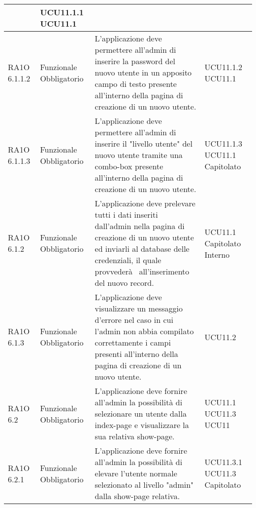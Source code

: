 \begin{center}
\begin{longtable}{ | l | p{2cm} | p{5cm} | p{1.7cm} |}
 &  UCU11.1.1 \newline  UCU11.1 \newline  \\ \hline      
        RA1O 6.1.1.2 & Funzionale \newline  Obbligatorio  & L'applicazione deve permettere all'admin di inserire la password del nuovo utente in un apposito campo di testo presente all'interno della pagina di creazione di un nuovo utente. &  UCU11.1.2 \newline  UCU11.1 \newline  \\ \hline      
        RA1O 6.1.1.3  & Funzionale \newline  Obbligatorio  & L'applicazione deve permettere all'admin di inserire il "livello utente" del nuovo utente tramite una combo-box presente all'interno della pagina di creazione di un nuovo utente. &  UCU11.1.3 \newline  UCU11.1 \newline  Capitolato \newline  \\ \hline      
        RA1O 6.1.2  & Funzionale \newline  Obbligatorio  & L'applicazione deve prelevare tutti i dati inseriti dall'admin nella pagina di creazione di un nuovo utente ed inviarli al database delle credenziali, il quale provvederà  all'inserimento del nuovo record.
 &  UCU11.1 \newline  Capitolato \newline  Interno \newline  \\ \hline      
        RA1O 6.1.3  & Funzionale \newline  Obbligatorio  & L'applicazione deve visualizzare un messaggio d'errore nel caso in cui l'admin non abbia compilato correttamente i campi presenti all'interno della pagina di creazione di un nuovo utente.
 &  UCU11.2 \newline  \\ \hline      
        RA1O 6.2  & Funzionale \newline  Obbligatorio  & L'applicazione deve fornire all'admin la possibilità di selezionare un utente dalla index-page e visualizzare la sua relativa show-page.
 &  UCU11.1 \newline  UCU11.3 \newline  UCU11 \newline  \\ \hline      
        RA1O 6.2.1 & Funzionale \newline  Obbligatorio  & L'applicazione deve fornire all'admin la possibilità di elevare l'utente normale selezionato al livello "admin" dalla show-page relativa. &  UCU11.3.1 \newline  UCU11.3 \newline  Capitolato \newline  \\ \hline      

\end{longtable}
\end{center}
